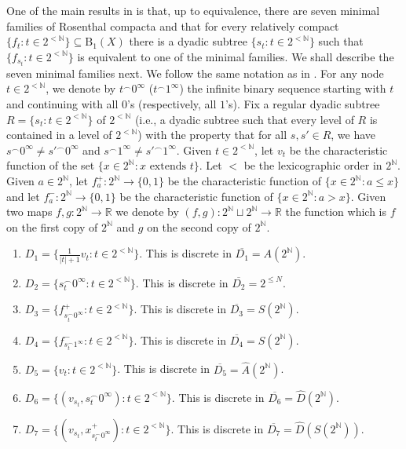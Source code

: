 One of the main results in \cite{argyros2008rosenthal} is that, up to equivalence, there are seven minimal families of Rosenthal compacta and that for every relatively compact $\{f_t:t\in 2^{<\mathbb{N}}\}\subseteq \mathrm{B}_1(X)$ there is a dyadic subtree $\{s_t:t\in 2^{<\mathbb{N}}\}$ such that $\{f_{s_t}:t\in 2^{<\mathbb{N}}\}$ is equivalent to one of the minimal families.
We shall describe the seven minimal families next.
We follow the same notation as in \cite{argyros2008rosenthal}.
For any node $t\in 2^{<\mathbb{N}}$, we denote by $t^\frown 0^{\infty}$ ($t^\frown 1^{\infty}$) the infinite binary sequence starting with $t$ and continuing with all $0$'s (respectively, all $1$'s).
Fix a regular dyadic subtree $R=\{s_t:t\in 2^{<\mathbb{N}}\}$ of $2^{<\mathbb{N}}$ (i.e., a dyadic subtree such that every level of $R$ is contained in a level of $2^{<\mathbb{N}}$) with the property that for all $s,s'\in R$, we have $s^\frown 0^{\infty}\neq s'^\frown 0^\infty$ and $s^\frown 1^{\infty}\neq s'^\frown 1^\infty$.
Given $t\in 2^{<\mathbb{N}}$, let $v_t$ be the characteristic function of the set $\{x\in 2^\mathbb{N}:x \text{ extends } t\}$.
Let $<$ be the lexicographic order in $2^\mathbb{N}$.
Given $a\in 2^{\mathbb{N}}$, let $f^+_a\colon 2^{\mathbb{N}}\to\{0,1\}$ be the characteristic function of $\{x\in 2^{\mathbb{N}}:a\leq x\}$ and let $f^-_a\colon 2^{\mathbb{N}}\to\{0,1\}$ be the characteristic function of $\{x\in 2^{\mathbb{N}}:a>x\}$.
Given two maps $f,g\colon 2^{\mathbb{N}}\to\mathbb{R}$ we denote by $(f,g)\colon 2^{\mathbb{N}}\sqcup 2^{\mathbb{N}}\to\mathbb{R}$ the function which is $f$ on the first copy of $2^{\mathbb{N}}$ and $g$ on the second copy of $2^{\mathbb{N}}$.

\begin{enumerate}
    \item $D_1=\{\frac{1}{|t|+1}v_t:t\in 2^{<\mathbb{N}}\}$.
    This is discrete in $\overline{D_1}=A(2^{\mathbb{N}})$.
    \item $D_2=\{s_t^\frown 0^{\infty}:t\in 2^{<\mathbb{N}}\}$.
    This is discrete in $\overline{D_2}=2^{\leq N}$.
    \item $D_3=\{f^+_{s_t^\frown 0^\infty}:t\in 2^{<\mathbb{N}}\}$.
    This is discrete in $\overline{D_3}=S(2^{\mathbb{N}})$.
    \item $D_4=\{f^-_{s_t^\frown 1^\infty}:t\in 2^{<\mathbb{N}}\}$.
    This is discrete in $\overline{D_4}=S(2^{\mathbb{N}})$.
    \item $D_5=\{v_t:t\in 2^{<\mathbb{N}}\}$.
    This is discrete in $\overline{D_5}=\hat{A}(2^{\mathbb{N}})$.
    \item $D_6=\{(v_{s_t},s_t^\frown 0^\infty):t\in 2^{<\mathbb{N}}\}$.
    This is discrete in $\overline{D_6}=\hat{D}(2^{\mathbb{N}})$.
    \item $D_7=\{(v_{s_t},x^+_{s_t^\frown 0^\infty}):t\in 2^{<\mathbb{N}}\}$.
    This is discrete in $\overline{D_7}=\hat{D}(S(2^{\mathbb{N}}))$.
\end{enumerate}

